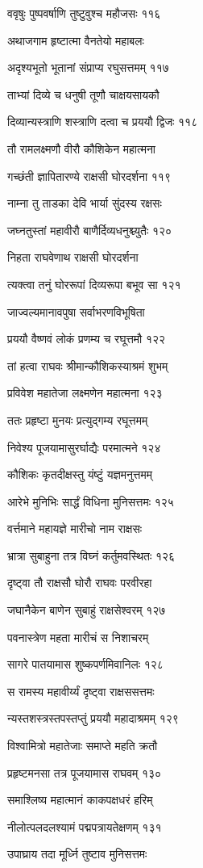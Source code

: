 ववृषुः पुष्पवर्षाणि तुष्टुवुश्च महौजसः ११६

अथाजगाम हृष्टात्मा वैनतेयो महाबलः

अदृश्यभूतो भूतानां संप्राप्य रघुसत्तमम् ११७

ताभ्यां दिव्ये च धनुषी तूणौ चाक्षयसायकौ

दिव्यान्यस्त्राणि शस्त्राणि दत्वा च प्रययौ द्विजः ११८

तौ रामलक्ष्मणौ वीरौ कौशिकेन महात्मना

गच्छंती ज्ञापितारण्ये राक्षसी घोरदर्शना ११९

नाम्ना तु ताडका देवि भार्या सुंदस्य रक्षसः

जघ्नतुस्तां महावीरौ बाणैर्दिव्यधनुश्च्युतैः १२०

निहता राघवेणाथ राक्षसी घोरदर्शना

त्यक्त्वा तनुं घोररूपां दिव्यरूपा बभूव सा १२१

जाज्वल्यमानावपुषा सर्वाभरणविभूषिता

प्रययौ वैष्णवं लोकं प्रणम्य च रघूत्तमौ १२२

तां हत्वा राघवः श्रीमान्कौशिकस्याश्रमं शुभम्

प्रविवेश महातेजा लक्ष्मणेन महात्मना १२३

ततः प्रहृष्टा मुनयः प्रत्युद्गम्य रघूत्तमम्

निवेश्य पूजयामासुरर्घाद्यैः परमात्मने १२४

कौशिकः कृतदीक्षस्तु यंष्टुं यज्ञमनुत्तमम्

आरेभे मुनिभिः सार्द्धं विधिना मुनिसत्तमः १२५

वर्त्तमाने महायज्ञे मारीचो नाम राक्षसः

भ्रात्रा सुबाहुना तत्र विघ्नं कर्तुमवस्थितः १२६

दृष्ट्वा तौ राक्षसौ घोरौ राघवः परवीरहा

जघानैकेन बाणेन सुबाहुं राक्षसेश्वरम् १२७

पवनास्त्रेण महता मारीचं स निशाचरम्

सागरे पातयामास शुष्कपर्णमिवानिलः १२८

स रामस्य महावीर्य्यं दृष्ट्वा राक्षससत्तमः

न्यस्तशस्त्रस्तपस्तप्तुं प्रययौ महादाश्रमम् १२९

विश्वामित्रो महातेजाः समाप्ते महति क्रतौ

प्रहृष्टमनसा तत्र पूजयामास राघवम् १३०

समाश्लिष्य महात्मानं काकपक्षधरं हरिम्

नीलोत्पलदलश्यामं पद्मपत्रायतेक्षणम् १३१

उपाघ्राय तदा मूर्ध्नि तुष्टाव मुनिसत्तमः

